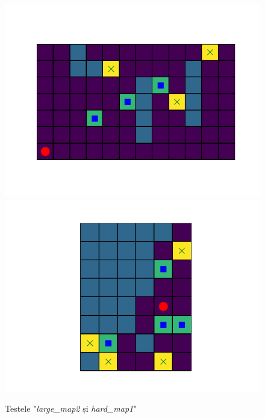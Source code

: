 \documentclass{article}
\begin{document}
\begin{figure}[ht]
    \begin{center}
        \includegraphics[scale=0.4]{large_map2.png}
        \includegraphics[scale=0.4]{hard_map1.png}
    \end{center}
    \caption{Testele "\textit{large\_map2} și \textit{hard\_map1}"}
    \label{fig:maps}
\end{figure}
\end{document}
